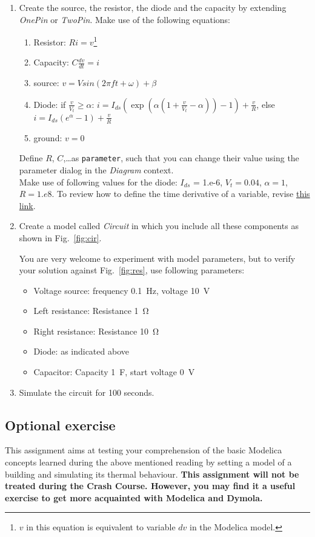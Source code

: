\documentclass[10pt,a4paper]{article}
\begin{document}
\begin{enumerate}
	\item Create the source, the resistor, the diode and the capacity by extending \textit{OnePin} or \textit{TwoPin}. Make use of the following equations:
	\begin{enumerate}
		\item Resistor: $R i = v$\footnote{$v$ in this equation is equivalent to variable $dv$ in the Modelica model.}
		\item Capacity: $C \frac{d v}{dt} = i$
		\item source: $v = V sin( 2 \pi f t + \omega) + \beta$
		\item Diode: if $ \frac{v}{V_t} \geq \alpha$: $i = I_{ds} \left( \exp\left(\alpha \left( 1 + \frac{v}{V_t} - \alpha \right)\right) - 1\right) + \frac{v}{R}$, else $i = I_{ds} (e^\alpha - 1) + \frac{v}{R}$
		\item ground: $ v = 0$
	\end{enumerate}
	Define $R$, $C$,\ldots as \texttt{parameter}, such that you can change their value using the parameter dialog in the \textit{Diagram} context.\\
	Make use of following values for the diode: $I_{ds}$ = 1.e-6, $V_t=0.04$, 
	$\alpha=1$, $R=1.e8$.
	To review how to define the time derivative of a variable, revise 
	\href{http://book.xogeny.com/behavior/equations/first_order/}{this link}.
	\item Create a model called \textit{Circuit} in which you include all these 
	components as shown in Fig.~\ref{fig:cir}.
	
	You are very welcome to experiment with model parameters, but to verify 
	your solution against Fig.~\ref{fig:res}, use following parameters:
	\begin{itemize}
		\item Voltage source: frequency \SI{0.1}{\hertz}, voltage \SI{10}{\volt}
		\item Left resistance: Resistance \SI{1}{\ohm}
		\item Right resistance: Resistance \SI{10}{\ohm}
		\item Diode: as indicated above
		\item Capacitor: Capacity \SI{1}{\farad}, start voltage \SI{0}{\volt}
	\end{itemize}
	\item Simulate the circuit for 100 seconds.
\end{enumerate}

\subsection*{Optional exercise}
This assignment aims at testing your comprehension of the basic Modelica concepts learned during the above mentioned reading by setting a model of a building and simulating its thermal behaviour. \textbf{This assignment will not be treated during the Crash Course. However, you may find it a useful exercise to get more acquainted with Modelica and Dymola.}
\end{document}
